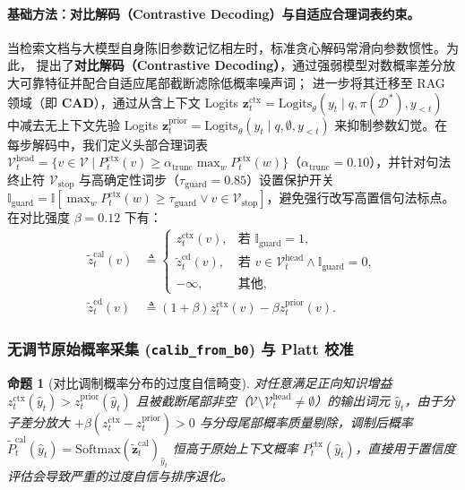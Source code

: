 \documentclass[11pt]{article}
\newtheorem{proposition}{命题}
\begin{document}
\paragraph{基础方法：对比解码（Contrastive Decoding）与自适应合理词表约束。}
当检索文档与大模型自身陈旧参数记忆相左时，标准贪心解码常滑向参数惯性。为此，\citet{li2023contrastive} 提出了\textbf{对比解码（Contrastive Decoding）}，通过强弱模型对数概率差分放大可靠特征并配合自适应尾部截断滤除低概率噪声词；\citet{shi2024cad} 进一步将其迁移至 RAG 领域（即 \textbf{CAD}），通过从含上下文 Logits $\mathbf{z}_t^{\text{ctx}} = \text{Logits}_{\theta}(y_t \mid q, \pi(\mathcal{D}^*), y_{<t})$ 中减去无上下文先验 Logits $\mathbf{z}_t^{\text{prior}} = \text{Logits}_{\theta}(y_t \mid q, \emptyset, y_{<t})$ 来抑制参数幻觉。在每步解码中，我们定义头部合理词表 $\mathcal{V}_t^{\text{head}} = \{v \in \mathcal{V} \mid P_t^{\text{ctx}}(v) \ge \alpha_{\text{trunc}} \max_w P_t^{\text{ctx}}(w)\}$（$\alpha_{\text{trunc}} = 0.10$），并针对句法终止符 $\mathcal{V}_{\text{stop}}$ 与高确定性词步（$\tau_{\text{guard}} = 0.85$）设置保护开关 $\mathbb{I}_{\text{guard}} = \mathbb{I}[\max_w P_t^{\text{ctx}}(w) \ge \tau_{\text{guard}} \lor v \in \mathcal{V}_{\text{stop}}]$，避免强行改写高置信句法标点。在对比强度 $\beta = 0.12$ 下有：
\begin{align}
\tilde{z}_t^{\text{cal}}(v) &\triangleq \begin{cases}
z_t^{\text{ctx}}(v), & \text{若 } \mathbb{I}_{\text{guard}} = 1, \\
\tilde{z}_t^{\text{cd}}(v), & \text{若 } v \in \mathcal{V}_t^{\text{head}} \land \mathbb{I}_{\text{guard}} = 0, \\
-\infty, & \text{其他},
\end{cases} \label{eq:zh_m3_cd} \\
\tilde{z}_t^{\text{cd}}(v) &\triangleq (1 + \beta) z_t^{\text{ctx}}(v) - \beta z_t^{\text{prior}}(v). \nonumber
\end{align}

\subsubsection{无调节原始概率采集 (\texttt{calib\_from\_b0}) 与 Platt 校准}
\begin{proposition}[对比调制概率分布的过度自信畸变]
\label{prop:zh_distortion}
对任意满足正向知识增益 $z_t^{\text{ctx}}(\hat{y}_t) > z_t^{\text{prior}}(\hat{y}_t)$ 且被截断尾部非空（$\mathcal{V} \setminus \mathcal{V}_t^{\text{head}} \neq \emptyset$）的输出词元 $\hat{y}_t$，由于分子差分放大 $+\beta(z_t^{\text{ctx}} - z_t^{\text{prior}}) > 0$ 与分母尾部概率质量剔除，调制后概率 $\tilde{P}_t^{\text{cal}}(\hat{y}_t) = \text{Softmax}(\tilde{\mathbf{z}}_t^{\text{cal}})_{\hat{y}_t}$ 恒高于原始上下文概率 $P_t^{\text{ctx}}(\hat{y}_t)$，直接用于置信度评估会导致严重的过度自信与排序退化。
\end{proposition}
\end{document}
